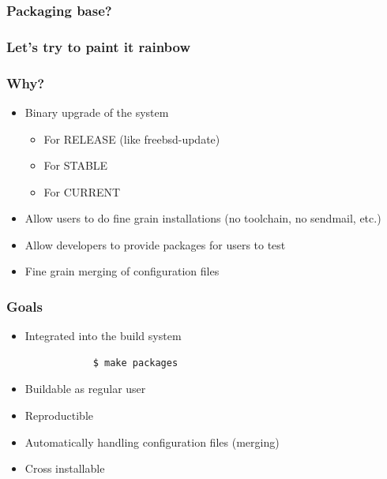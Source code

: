 \begin{frame}
	\frametitle{Packaging base?}
	\pause
	\colorbox{red}{\makebox[\textwidth]{\textcolor{white}{Do not split}}}
	\pause
	\colorbox{orange}{}
	\pause
	\colorbox{yellow}{}
	\pause
	\colorbox{green}{}
	\pause
	\colorbox{blue}{\makebox[\textwidth]{\textcolor{white}{No development file}}}
	\pause
	\colorbox{indigo!75}{\makebox[\textwidth]{\textcolor{white}{No documentation}}}
	\pause
	\colorbox{violet}{\makebox[\textwidth]{\textcolor{white}{I want debug files}}}
\end{frame}

\begin{frame}
	\frametitle{Let's try to paint it rainbow}
	\colorbox{red}{\makebox[\textwidth]{\textcolor{white}{FreeBSD FreeBSD-base FreeBSD-kernel FreeBSD-docs}}}
	\pause
	\colorbox{orange}{}
	\pause
	\colorbox{yellow}{}
	\pause
	\colorbox{green}{}
	\pause
	\colorbox{blue}{\makebox[\textwidth]{\textcolor{white}{runtime separated from development files}}}
	\pause
	\colorbox{indigo!75}{\makebox[\textwidth]{\textcolor{white}{FreeBSD-docs (does not concern manpages)}}}
	\pause
	\colorbox{violet}{\makebox[\textwidth]{\textcolor{white}{-debug packages}}}
\end{frame}

\begin{frame}
	\frametitle{Why?}
	\begin{itemize}
		\item Binary upgrade of the system
			\begin{itemize}
				\item For RELEASE (like freebsd-update)
				\item For STABLE
				\item For CURRENT
			\end{itemize}
		\item Allow users to do fine grain installations (no toolchain, no sendmail, etc.)
		\item Allow developers to provide packages for users to test
		\item Fine grain merging of configuration files
	\end{itemize}
\end{frame}

\begin{frame}[fragile]
	\frametitle{Goals}
	\begin{itemize}
		\item Integrated into the build system
			\begin{lstlisting}
			$ make packages
			\end{lstlisting}
		\item Buildable as regular user
		\item Reproductible
		\item Automatically handling configuration files (merging)
		\item Cross installable
	\end{itemize}
\end{frame}

